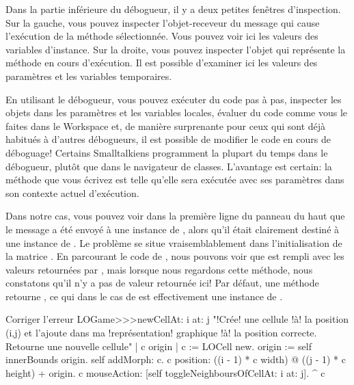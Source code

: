 \documentclass[a4paper,10pt,twoside]{book}
\begin{document}
Dans la partie inférieure du débogueur, il y a deux petites fenêtres
d'inspection. Sur la gauche, vous pouvez inspecter l'objet-receveur du 
message qui cause l'exécution de la méthode sélectionnée. Vous pouvez 
voir ici les valeurs des variables d'instance.
Sur la droite, vous pouvez inspecter l'objet qui représente la méthode 
en cours d'exécution. Il est possible d'examiner ici les valeurs des 
paramètres et les variables temporaires.

En utilisant le débogueur, vous pouvez exécuter du code pas à pas,
inspecter les objets dans les paramètres et les variables locales,
évaluer du code comme vous le faites dans le Workspace et, de manière
surprenante pour ceux qui sont déjà habitués à d'autres débogueurs, il
est possible de modifier le code en cours de déboguage! 
Certains Smalltalkiens programment la plupart du temps dans le
débogueur, plutôt que dans le navigateur de classes.
L'avantage est certain: la méthode que vous écrivez est telle
qu'elle sera exécutée \ie avec ses paramètres dans son contexte
actuel d'exécution.

Dans notre cas, vous pouvez voir dans la première ligne du panneau du 
haut que le message  a été envoyé à une instance de , 
alors qu'il était clairement destiné à une instance de .
Le problème se situe vraisemblablement dans l'initialisation de la matrice .
En parcourant le code de , nous pouvons
voir que  est rempli avec les valeurs retournées par
, mais lorsque nous regardons cette méthode, nous
constatons qu'il n'y a pas de valeur retournée ici!
Par défaut, une méthode retourne , ce qui dans le cas 
de  est effectivement une instance de .


\begin{method}{Corriger l'erreur}
LOGame>>>newCellAt: i at: j
    "!Crée! une cellule !à! la position (i,j) et l'ajoute dans ma !représentation! graphique !à! la position correcte. Retourne une nouvelle cellule"
   | c origin |
   c := LOCell new.
   origin := self innerBounds origin.
   self addMorph: c.
   c position: ((i - 1) * c width) @ ((j - 1) * c height) + origin.
   c mouseAction: [self toggleNeighboursOfCellAt: i at: j].
   ^ c
\end{method}
\end{document}

